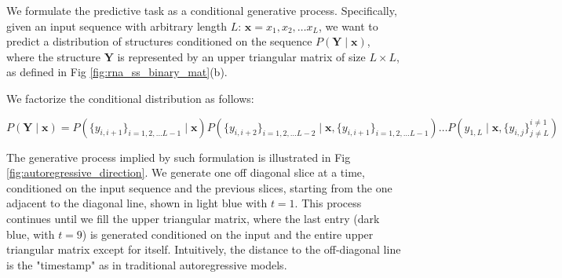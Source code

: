\documentclass{article}
\begin{document}
We formulate the predictive task as a conditional generative process.
Specifically, given an input sequence with arbitrary length $L$: $\bm{x} = x_1, x_2, \dots x_{L}$,
we want to predict a distribution of structures conditioned on the sequence $P(\bm{Y} \mid \bm{x})$,
where the structure $\bm{Y}$ is represented by an upper triangular matrix of size $L \times L$, as defined in Fig \ref{fig:rna_ss_binary_mat}(b).


We factorize the conditional distribution as follows:

\begin{equation} \label{eq:conditional_distribution}
{\scriptstyle
P(\bm{Y} \mid \bm{x}) = P(\{y_{i, i+1}\}_{i=1, 2, \dots L-1} \mid \bm{x})
P(\{y_{i, i+2}\}_{i=1, 2, \dots L-2} \mid \bm{x}, \{y_{i, i+1}\}_{i=1, 2, \dots L-1})
\dots
P(y_{1, L} \mid \bm{x}, \{y_{i, j}\}^{i \neq 1}_{j \neq L})}
\end{equation}


The generative process implied by such formulation is illustrated in Fig \ref{fig:autoregressive_direction}.
We generate one off diagonal slice at a time, conditioned on the input sequence and the previous slices,
starting from the one adjacent to the diagonal line, shown in light blue with $t=1$.
This process continues until we fill the upper triangular matrix,
where the last entry (dark blue, with $t=9$) is generated conditioned on the input and the entire upper triangular matrix except for itself.
Intuitively, the distance to the off-diagonal line is the "timestamp" as in traditional autoregressive models.

%
%
\end{document}
